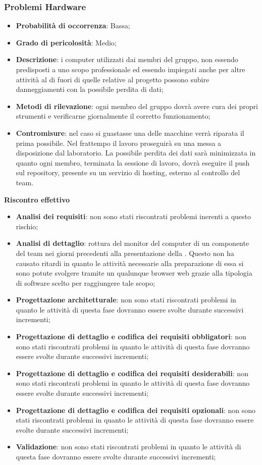 		\subsubsection{Problemi Hardware} %
		\label{ssub:problemi_hardware}
			\begin{itemize}
				\item \textbf{Probabilità di occorrenza}: Bassa;
				\item \textbf{Grado di pericolosità}: Medio;
				\item \textbf{Descrizione}: i computer utilizzati dai membri del gruppo, non essendo predisposti a uno scopo professionale ed essendo impiegati anche per altre attività al di fuori di quelle relative al progetto possono subire danneggiamenti con la possibile perdita di dati;
				\item \textbf{Metodi di rilevazione}: ogni membro del gruppo dovrà avere cura dei propri strumenti e verificarne giornalmente il corretto funzionamento;
				\item \textbf{Contromisure}: nel caso si guastasse una delle macchine verrà riparata il prima possibile. Nel frattempo il lavoro proseguirà su una messa a disposizione dal laboratorio. La possibile perdita dei dati sarà minimizzata in quanto ogni membro, terminata la sessione di lavoro, dovrà eseguire il push sul repository, presente su un servizio di hosting, esterno al controllo del team.
			\end{itemize}
		\noindent
		\textbf{Riscontro effettivo}
			\begin{itemize}
				\item \textbf{Analisi dei requisiti}: non sono stati riscontrati problemi inerenti a questo rischio;
				\item \textbf{Analisi di dettaglio}: rottura del monitor del computer di un componente del team nei giorni precedenti alla presentazione della \RR. Questo non ha causato ritardi in quanto le attività necessarie alla preparazione di essa si sono potute svolgere tramite un qualunque browser web grazie alla tipologia di software scelto per raggiungere tale scopo;
				\item \textbf{Progettazione architetturale}: non sono stati riscontrati problemi in quanto le attività di questa fase dovranno essere svolte durante successivi incrementi;
				\item \textbf{Progettazione di dettaglio e codifica dei requisiti obbligatori}: non sono stati riscontrati problemi in quanto le attività di questa fase dovranno essere svolte durante successivi incrementi;
				\item \textbf{Progettazione di dettaglio e codifica dei requisiti desiderabili}: non sono stati riscontrati problemi in quanto le attività di questa fase dovranno essere svolte durante successivi incrementi;
				\item \textbf{Progettazione di dettaglio e codifica dei requisiti opzionali}: non sono stati riscontrati problemi in quanto le attività di questa fase dovranno essere svolte durante successivi incrementi;
				\item \textbf{Validazione}: non sono stati riscontrati problemi in quanto le attività di questa fase dovranno essere svolte durante successivi incrementi;
			\end{itemize}
